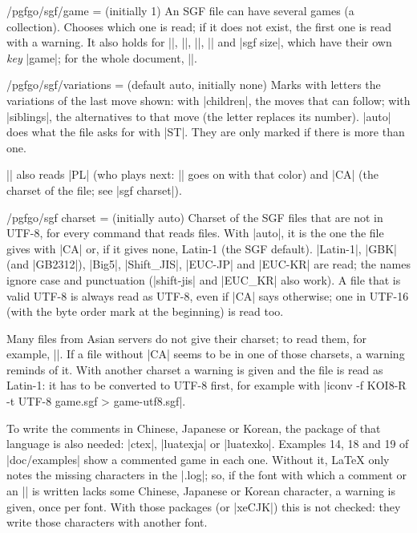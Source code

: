 \begin{key}{/pgfgo/sgf/game =  (initially 1)}
	An SGF file can have several games (a collection). Chooses which one is read; if it does not exist, the first one is read with a warning. It also holds for |\sgfanimation|, |\sgfdiagrams|, |\sgfcomment|, |\sgfinfo| and |sgf size|, which have their own \emph{key} |game|; for the whole document, ||.
\end{key}

\begin{key}{/pgfgo/sgf/variations =  (default auto, initially none)}
	Marks with letters the variations of the last move shown: with |children|, the moves that can follow; with |siblings|, the alternatives to that move (the letter replaces its number). |auto| does what the file asks for with |ST|. They are only marked if there is more than one.

	\begin{codeexample}[]
		\begin{goban}[sgf size = variations]
		\end{goban}
	\end{codeexample}
\end{key}

|\sgf| also reads |PL| (who plays next: |\moves| goes on with that color) and |CA| (the charset of the file; see |sgf charset|).

\begin{key}{/pgfgo/sgf charset =  (initially auto)}
	Charset of the SGF files that are not in UTF-8, for every command that reads files. With |auto|, it is the one the file gives with |CA| or, if it gives none, Latin-1 (the SGF default). |Latin-1|, |GBK| (and |GB2312|), |Big5|, |Shift_JIS|, |EUC-JP| and |EUC-KR| are read; the names ignore case and punctuation (|shift-jis| and |EUC_KR| also work). A file that is valid UTF-8 is always read as UTF-8, even if |CA| says otherwise; one in UTF-16 (with the byte order mark at the beginning) is read too.

	Many files from Asian servers do not give their charset; to read them, for example, ||. If a file without |CA| seems to be in one of those charsets, a warning reminds of it. With another charset a warning is given and the file is read as Latin-1: it has to be converted to UTF-8 first, for example with |iconv -f KOI8-R -t UTF-8 game.sgf > game-utf8.sgf|.

	To write the comments in Chinese, Japanese or Korean, the package of that language is also needed: |ctex|, |luatexja| or |luatexko|. Examples 14, 18 and 19 of |doc/examples| show a commented game in each one. Without it, LaTeX only notes the missing characters in the |.log|; so, if the font with which a comment or an |\sgfinfo| is written lacks some Chinese, Japanese or Korean character, a warning is given, once per font. With those packages (or |xeCJK|) this is not checked: they write those characters with another font.
\end{key}

